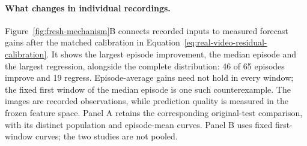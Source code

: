 


\paragraph{What changes in individual recordings.}
Figure~\ref{fig:fresh-mechanism}B connects recorded inputs to measured
forecast gains after the matched calibration in
Equation~\ref{eq:real-video-residual-calibration}. It shows the largest episode improvement,
the median episode and the largest regression, alongside the complete
distribution: 46 of 65 episodes improve and 19 regress. Episode-average gains
need not hold in every window; the fixed first window of the median episode
is one such counterexample. The images are recorded observations, while
prediction quality is measured in the frozen feature space.
Panel A retains the corresponding original-test comparison, with its distinct
population and episode-mean curves. Panel B uses fixed first-window curves;
the two studies are not pooled.

